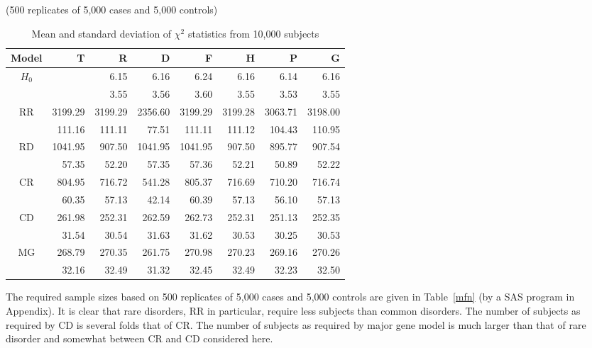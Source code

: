 \begin{table}[h]\centering
\caption{Mean and standard deviation of $\chi^2$ statistics from
10,000 subjects\label{mf2}} (500 replicates of 5,000 cases and 5,000 controls)\\
\begin{tabular}{crrrrrrr}
\\
\hline
Model   &    T &      R &       D &        F &       H &       P &       G\\
\hline
$H_0$&         &   6.15 &    6.16 &     6.24 &    6.16 &    6.14 &    6.16\\%
     &         &   3.55 &    3.56 &     3.60 &    3.55 &    3.53 &    3.55\\%
RR   & 3199.29 &3199.29 & 2356.60 &  3199.29 & 3199.28 & 3063.71 & 3198.00\\
     &  111.16 & 111.11 &   77.51 &   111.11 &  111.12 &  104.43 &  110.95\\
RD   & 1041.95 & 907.50 & 1041.95 &  1041.95 &  907.50 &  895.77 &  907.54\\
     &   57.35 &  52.20 &   57.35 &    57.36 &   52.21 &   50.89 &   52.22\\
CR   &  804.95 & 716.72 &  541.28 &   805.37 &  716.69 &  710.20 &  716.74\\
     &   60.35 &  57.13 &   42.14 &    60.39 &   57.13 &   56.10 &   57.13\\
CD   &  261.98 & 252.31 &  262.59 &   262.73 &  252.31 &  251.13 &  252.35\\
     &   31.54 &  30.54 &   31.63 &    31.62 &   30.53 &   30.25 &   30.53\\
MG   &  268.79 & 270.35 &  261.75 &   270.98 &  270.23 &  269.16 &  270.26\\
     &   32.16 &  32.49 &   31.32 &    32.45 &   32.49 &   32.23 &   32.50\\
\hline
\end{tabular}
\end{table}

The required sample sizes based on 500 replicates of 5,000 cases and 5,000
controls are given in Table~\ref{mfn} (by a SAS program in Appendix).  It is
clear that rare disorders, RR in particular, require less subjects than common
disorders.  The number of subjects as required by CD is several folds that of
CR.  The number of subjects as required by major gene model is much larger than
that of rare disorder and somewhat between CR and CD considered here.

